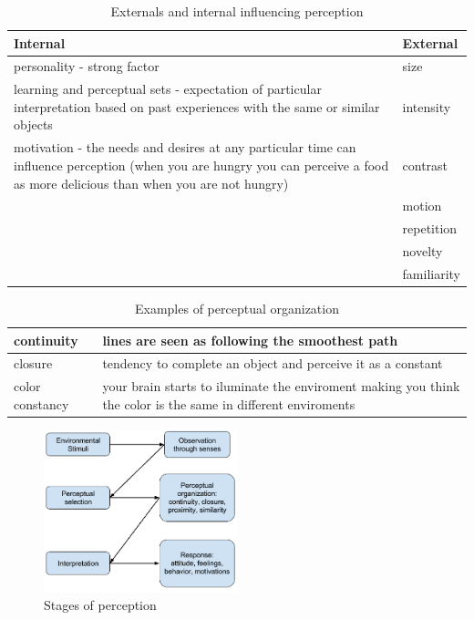 \documentclass[12pt,article,oneside,a4paper]{memoir}
\begin{document}
\begin{table}
  \begin{tabular}{ p{13cm} |  p{2cm} }
    \hline
    Internal & External \\ \hline
    personality -  strong factor & size \\ \hline
    learning and perceptual sets - expectation of particular interpretation based on past experiences with the same or similar objects & intensity \\ \hline
    motivation - the needs and desires at any particular time can influence perception (when you are hungry you can perceive a food as more delicious than when you are not hungry) & contrast \\ \hline
	 & motion \\ \hline
 	 & repetition \\ \hline
 	 & novelty \\ \hline
     & familiarity \\
    \hline
  \end{tabular}
  \caption{Externals and internal influencing perception}
  \label{table:factors-perception}
\end{table}

\begin{table}
  \begin{tabular}{ l |  p{12.5cm} }
    \hline
    continuity & lines are seen as following the smoothest path \\ \hline
    closure & tendency to complete an object and perceive it as a constant \\ \hline
    color constancy & your brain starts to iluminate the enviroment making you think the color is the same in different enviroments \\
    \hline
  \end{tabular}
  \caption{Examples of perceptual organization}
  \label{table:perceptual-organization}
\end{table}

\begin{figure}
  \centering
  \includegraphics[width=0.5\textwidth]{imgs/perception-stages.png}
  \caption{Stages of perception}
  \label{fig:perception-stages}
\end{figure}
\end{document}
